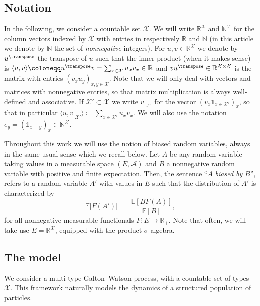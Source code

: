 \begin{refsegment}
\subsection*{Notation}
In the following, we consider a countable set $\mathcal{X}$. We will write $\mathbb{R}^{\mathcal{X}}$ and $\mathbb{N}^{\mathcal{X}}$ for the column vectors indexed by $\mathcal{X}$ with entries in respectively $\mathbb{R}$ and $\mathbb{N}$ (in this article we denote by $\mathbb{N}$ the set of \emph{nonnegative} integers).
For $u, v\in\mathbb{R}^{\mathcal{X}}$ we denote by $u^\transpose$ the transpose of $u$ such that the inner product (when it makes sense) is $\langle u,v\rangle \coloneqq u^\transpose v = \sum_{x\in\mathcal{X}}u_x v_x\in \mathbb{R}$ and $vu^\transpose \in\mathbb{R}^{\mathcal{X}\times \mathcal{X}}$ is the matrix with entries $(v_x u_y)_{x,y\in\mathcal{X}}$.
Note that we will only deal with vectors and matrices with nonnegative entries, so that matrix multiplication is always well-defined and associative.
If $\mathcal{X}'\subset \mathcal{X}$ we write $v|_{\mathcal{X}'}$ for the vector $(v_x\mathds{1}_{x\in \mathcal{X}'})_x$, so that in particular $\langle u, v|_{\mathcal{X}'}\rangle \coloneqq\sum_{x\in\mathcal{X}'}u_xv_x$.
We will also use the notation $e_y=(\mathds{1}_{x=y})_{x}\in \mathbb{N}^{\mathcal{X}}$.


Throughout this work we will use the notion of biased random variables, always in the same usual sense which we recall below. 
Let $A$ be any random variable taking values in a measurable space
$(E, \mathcal{A})$ and $B$ a nonnegative random variable with positive
and finite expectation. Then, the sentence ``$A$ \emph{biased by} $B$'', refers to a random variable $A'$ with values in $E$ such that the distribution of $A'$ is characterized by
\begin{equation}\label{eq:biased_rv}
\mathbb{E}\big[F(A')\big]\ =\ \frac{\mathbb{E}[BF(A)]}{\mathbb{E}[B]},
\end{equation}
for all nonnegative measurable functionals $F:E \to\mathbb{R}_+$.
Note that often, we will take use $E= \mathbb{R}^{\mathcal{X}}$,
equipped with the product $\sigma$-algebra.

\subsection*{The model}
We consider a multi-type Galton--Watson process, with a countable set
of types $\mathcal{X}$. This framework naturally models the
  dynamics of a structured population of particles.


\end{refsegment}
